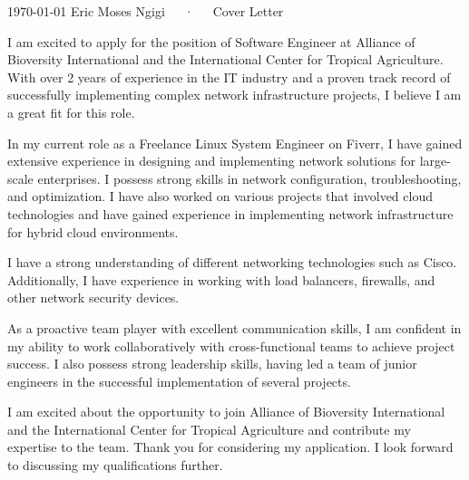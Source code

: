 \documentclass[11pt, a4paper]{configuration}
\begin{document}
\makecvheader[C]

\makecvfooter
  {\today}
  {Eric Moses Ngigi~~~·~~~Cover Letter}
  {}

\makelettertitle

\begin{cvletter}

I am excited to apply for the position of Software Engineer at Alliance of Bioversity International and the International Center for Tropical Agriculture. With over 2 years of experience in the IT industry and a proven track record of successfully implementing complex network infrastructure projects, I believe I am a great fit for this role.

In my current role as a Freelance Linux System Engineer on Fiverr, I have gained extensive experience in designing and implementing network solutions for large-scale enterprises. I possess strong skills in network configuration, troubleshooting, and optimization. I have also worked on various projects that involved cloud technologies and have gained experience in implementing network infrastructure for hybrid cloud environments.

I have a strong understanding of different networking technologies such as Cisco. Additionally, I have experience in working with load balancers, firewalls, and other network security devices.

As a proactive team player with excellent communication skills, I am confident in my ability to work collaboratively with cross-functional teams to achieve project success. I also possess strong leadership skills, having led a team of junior engineers in the successful implementation of several projects.

I am excited about the opportunity to join Alliance of Bioversity International and the International Center for Tropical Agriculture and contribute my expertise to the team. Thank you for considering my application. I look forward to discussing my qualifications further.

\end{cvletter}


\makeletterclosing
\end{document}
